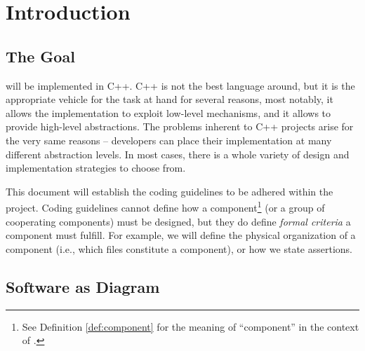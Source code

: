 %

\chapter{Introduction}
\label{cha:introduction}


\section{The Goal}
\label{sec:goal}

\SYNEIGHT will be implemented in C++. C++ is not the best language
around, but it is the appropriate vehicle for the task at hand for
several reasons, most notably, it allows the implementation to exploit
low-level mechanisms, and it allows to provide high-level
abstractions.  The problems inherent to C++ projects arise for the
very same reasons -- developers can place their implementation at many
different abstraction levels.  In most cases, there is a whole variety
of design and implementation strategies to choose from.

%
This document will establish the coding guidelines to be adhered
within the \SYNEIGHT project. 
%
Coding guidelines cannot define how a component\footnote{See
  Definition \vref{def:component} for the meaning of ``component'' in
  the context of \SYNEIGHT.} (or a group of cooperating components)
must be designed, but they do define \emph{formal criteria} a
component must fulfill.
% 
For example, we will define the physical organization of a component
(i.e., which files constitute a component), or how we state
assertions.



\section{Software as Diagram}
\label{sec:software-as-diagram}

